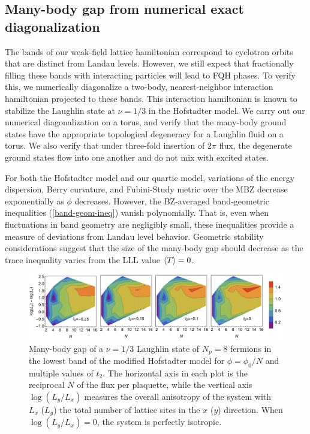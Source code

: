 \documentclass[aps,prb,twocolumn,letterpaper,twoside,nobalancelastpage,groupedaddress,amsmath,amssymb,floatfix,citeautoscript]{revtex4-1}
\begin{document}
\subsection{Many-body gap from numerical exact diagonalization}
The bands of our weak-field lattice hamiltonian correspond to cyclotron orbits that are distinct from Landau levels. However, we still expect that fractionally filling these bands with interacting particles will lead to FQH phases. To verify this, we numerically diagonalize a two-body, nearest-neighbor interaction hamiltonian projected to these bands. This interaction hamiltonian is known to stabilize the Laughlin state at $\nu = 1/3$ in the Hofstadter model. We carry out our numerical diagonalization on a torus, and verify that the many-body ground states have the appropriate topological degeneracy for a Laughlin fluid on a torus. We also verify that under three-fold insertion of $2\pi$ flux, the degenerate ground states flow into one another and do not mix with excited states.

For both the Hofstadter model and our quartic model, variations of the energy dispersion, Berry curvature, and Fubini-Study metric over the MBZ decrease exponentially as $\phi$ decreases\cite{Harper:2014vi,bauer_quantum_2016}. However, the BZ-averaged band-geometric inequalities (\ref{band-geom-ineq}) vanish polynomially. That is, even when fluctuations in band geometry are negligibly small, these inequalities provide a measure of deviations from Landau level behavior. Geometric stability considerations \cite{jackson_geometric_2015} suggest that the size of the many-body gap should decrease as the trace inequality varies from the LLL value $\expval{T}=0$.


\begin{figure}[thb]
\centering
\includegraphics[width=6.3in]{gap-grid-2.pdf}
\caption{Many-body gap of a $\nu=1/3$ Laughlin state of $N_p=8$ fermions in the lowest band of the modified Hofstadter model for $\phi = \phi_0/N$ and multiple values of $t_2$. The horizontal axis in each plot is the reciprocal $N$ of the flux per plaquette, while the vertical axis $\log(L_y/L_x)$ measures the overall anisotropy of the system with $L_x$ ($L_y$) the total number of lattice sites in the $x$ ($y$) direction. When $\log(L_y/L_x)=0$, the system is perfectly isotropic. }
\end{figure}
\end{document}
